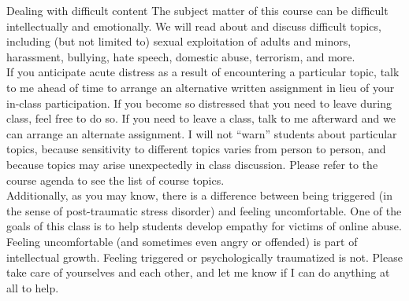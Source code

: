 \documentclass[nobackground,dvipsnames,table]{beamer}
\begin{document}
\begin{frame}{} %
    \thispagestyle{empty}
    \centering
\end{frame}

\begin{frame}{Dealing with difficult content} %
    \footnotesize
    The subject matter of this course can be difficult intellectually and emotionally.  We will read about and discuss difficult topics, including (but not limited to) sexual exploitation of adults and minors, harassment, bullying, hate speech, domestic abuse, terrorism, and more. \\ 
    If you anticipate acute distress as a result of encountering a particular topic, talk to me ahead of time to arrange an alternative written assignment in lieu of your in-class participation. If you become so distressed that you need to leave during class, feel free to do so. If you need to leave a class, talk to me afterward and we can arrange an alternate assignment.  I will not “warn” students about particular topics, because sensitivity to different topics varies from person to person, and because topics may arise unexpectedly in class discussion. Please refer to the course agenda to see the list of course topics. \\
    Additionally, as you may know, there is a difference between being triggered (in the sense of post-traumatic stress disorder) and feeling uncomfortable. One of the goals of this class is to help students develop empathy for victims of online abuse. Feeling uncomfortable (and sometimes even angry or offended) is part of intellectual growth. Feeling triggered or psychologically traumatized is not. Please take care of yourselves and each other, and let me know if I can do anything at all to help.
\end{frame}
\end{document}
